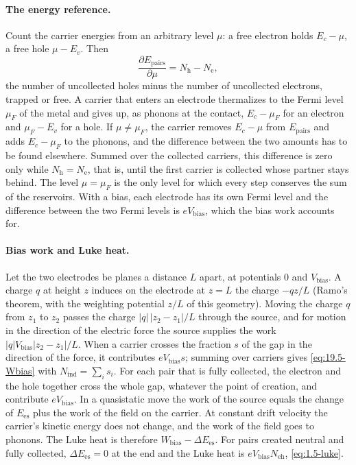 \paragraph{The energy reference.} Count the carrier energies from an arbitrary level $\mu$: a free electron holds $E_c - \mu$, a free hole $\mu - E_v$. Then
\begin{equation*}
  \frac{\partial E_{\mathrm{pairs}}}{\partial\mu} = N_{\mathrm{h}} - N_{\mathrm{e}} ,
\end{equation*}
the number of uncollected holes minus the number of uncollected electrons, trapped or free. A carrier that enters an electrode thermalizes to the Fermi level $\mu_F$ of the metal and gives up, as phonons at the contact, $E_c - \mu_F$ for an electron and $\mu_F - E_v$ for a hole. If $\mu \ne \mu_F$, the carrier removes $E_c - \mu$ from $E_{\mathrm{pairs}}$ and adds $E_c - \mu_F$ to the phonons, and the difference between the two amounts has to be found elsewhere. Summed over the collected carriers, this difference is zero only while $N_{\mathrm{h}} = N_{\mathrm{e}}$, that is, until the first carrier is collected whose partner stays behind. The level $\mu = \mu_F$ is the only level for which every step conserves the sum of the reservoirs. With a bias, each electrode has its own Fermi level and the difference between the two Fermi levels is $eV_{\mathrm{bias}}$, which the bias work accounts for.

\paragraph{Bias work and Luke heat.} Let the two electrodes be planes a distance $L$ apart, at potentials $0$ and $V_{\mathrm{bias}}$. A charge $q$ at height $z$ induces on the electrode at $z = L$ the charge $-qz/L$ (Ramo's theorem, with the weighting potential $z/L$ of this geometry). Moving the charge $q$ from $z_1$ to $z_2$ passes the charge $|q|\,|z_2 - z_1|/L$ through the source, and for motion in the direction of the electric force the source supplies the work $|q|V_{\mathrm{bias}}|z_2 - z_1|/L$. When a carrier crosses the fraction $s$ of the gap in the direction of the force, it contributes $eV_{\mathrm{bias}}s$; summing over carriers gives \cref{eq:19.5-Wbias} with $N_{\mathrm{ind}} = \sum_is_i$. For each pair that is fully collected, the electron and the hole together cross the whole gap, whatever the point of creation, and contribute $eV_{\mathrm{bias}}$. In a quasistatic move the work of the source equals the change of $E_{\mathrm{es}}$ plus the work of the field on the carrier. At constant drift velocity the carrier's kinetic energy does not change, and the work of the field goes to phonons. The Luke heat is therefore $W_{\mathrm{bias}} - \Delta E_{\mathrm{es}}$. For pairs created neutral and fully collected, $\Delta E_{\mathrm{es}} = 0$ at the end and the Luke heat is $eV_{\mathrm{bias}}N_{\mathrm{eh}}$, \cref{eq:1.5-luke}.

